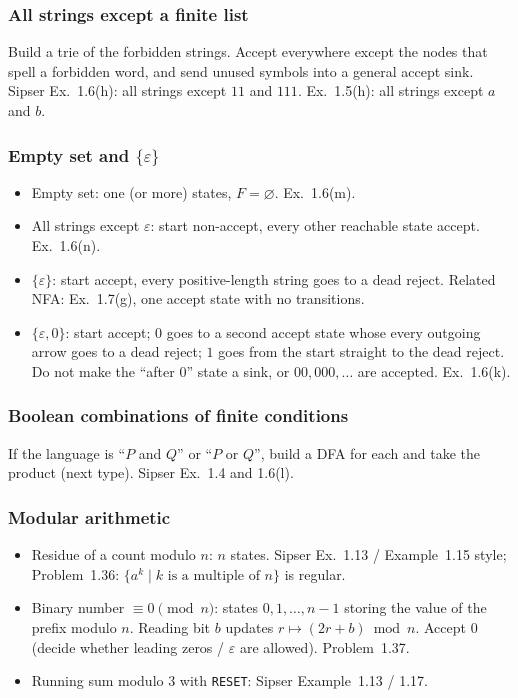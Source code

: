 \documentclass[11pt,a4paper]{article}
\newcommand{\eps}{\varepsilon}
\newcommand{\set}[1]{\{#1\}}
\begin{document}
\subsubsection{All strings except a finite list}

Build a trie of the forbidden strings. Accept everywhere except the
nodes that spell a forbidden word, and send unused symbols into a
general accept sink. Sipser Ex.~1.6(h): all strings except $11$ and
$111$. Ex.~1.5(h): all strings except $a$ and $b$.

\subsubsection{Empty set and $\set{\eps}$}

\begin{itemize}[nosep]
  \item Empty set: one (or more) states, $F=\varnothing$. Ex.~1.6(m).
  \item All strings except $\eps$: start non-accept, every other
        reachable state accept. Ex.~1.6(n).
  \item $\set{\eps}$: start accept, every positive-length string goes
        to a dead reject. Related NFA: Ex.~1.7(g), one accept state
        with no transitions.
  \item $\set{\eps,0}$: start accept; $0$ goes to a second accept
        state whose every outgoing arrow goes to a dead reject; $1$
        goes from the start straight to the dead reject. Do not make
        the ``after $0$'' state a sink, or $00,000,\ldots$ are
        accepted. Ex.~1.6(k).
\end{itemize}

\subsubsection{Boolean combinations of finite conditions}

If the language is ``$P$ and $Q$'' or ``$P$ or $Q$'', build a DFA for
each and take the product (next type). Sipser Ex.~1.4 and 1.6(l).

\subsubsection{Modular arithmetic}

\begin{itemize}[nosep]
  \item Residue of a count modulo $n$: $n$ states. Sipser Ex.~1.13 /
        Example~1.15 style; Problem~1.36: $\{a^k\mid k\text{ is a
        multiple of }n\}$ is regular.
  \item Binary number $\equiv 0\pmod n$: states $0,1,\dots,n-1$
        storing the value of the prefix modulo $n$. Reading bit $b$
        updates $r\mapsto (2r+b)\bmod n$. Accept $0$ (decide whether
        leading zeros / $\eps$ are allowed). Problem~1.37.
  \item Running sum modulo $3$ with \texttt{RESET}: Sipser
        Example~1.13 / 1.17.
\end{itemize}
\end{document}
